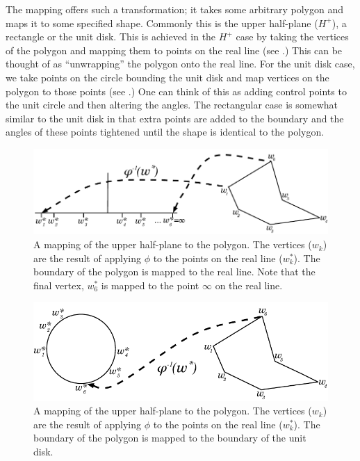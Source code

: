 The \sch mapping offers such a transformation; it takes some arbitrary polygon and maps it to some specified shape. Commonly this is the upper half-plane ($H^+$), a rectangle or the unit disk. This is achieved in the $H^+$ case by taking the vertices of the polygon and mapping them to points on the real line (see .) This can be thought of as ``unwrapping'' the polygon onto the real line. For the unit disk case, we take points on the circle bounding the unit disk and map vertices on the polygon to those points (see .) One can think of this as adding control points to the unit circle and then altering the angles. The rectangular case is somewhat similar to the unit disk in that extra points are added to the boundary and the angles of these points tightened until the shape is identical to the polygon.

\begin{figure} [tbp]
\centering
\includegraphics[scale=0.6]{sc/figs/reallinedia.pdf}
\caption{A mapping of the upper half-plane to the polygon. The vertices ($w_k$) are the result of applying $\phi$ to the points on the real line ($w^*_k$). The boundary of the polygon is mapped to the real line. Note that the final vertex, $w^*_6$ is mapped to the point $\infty$ on the real line.}
\label{reallinedia}
\end{figure}

\begin{figure} [tbp]
\centering
\includegraphics[scale=0.6]{sc/figs/unitdiskdia.pdf}
\caption{A mapping of the upper half-plane to the polygon. The vertices ($w_k$) are the result of applying $\phi$ to the points on the real line ($w^*_k$). The boundary of the polygon is mapped to the boundary of the unit disk.}
\label{unitdiskdia}
\end{figure}

